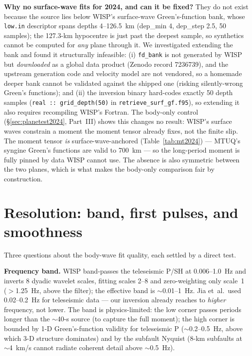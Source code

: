 \documentclass[11pt]{article}
\begin{document}
\textbf{Why no surface-wave fits for 2024, and can it be fixed?} They do not exist because the
source lies below WISP's surface-wave Green's-function bank, whose \texttt{low.in} descriptor
spans depths 4--126.5~km (dep\_min 4, dep\_step 2.5, 50 samples); the 127.3-km hypocentre is
just past the deepest sample, so synthetics cannot be computed for \emph{any} plane through it.
We investigated extending the bank and found it structurally infeasible: (i) \texttt{fd\_bank}
is not generated by WISP but \emph{downloaded} as a global data product (Zenodo record
7236739), and the upstream generation code and velocity model are not vendored, so a homemade
deeper bank cannot be validated against the shipped one (risking silently-wrong Green's
functions); and (ii) the inversion binary hard-codes exactly 50 depth samples
(\texttt{real :: grid\_depth(50)} in \texttt{retrieve\_surf\_gf.f95}), so extending it also
requires recompiling WISP's Fortran. The body-only control (\S\ref{sec:planetest2024},
Part~III) shows this changes no result: WISP's surface waves constrain a moment the moment
tensor already fixes, not the finite slip. The moment tensor \emph{is} surface-wave-anchored
(Table~\ref{tab:mt2024}) --- MTUQ's syngine Green's functions are valid to 700~km --- so the
long-period moment is fully pinned by data WISP cannot use. The absence is also symmetric
between the two planes, which is what makes the body-only comparison fair by construction.

\section{Resolution: band, first pulses, and smoothness}
\label{sec:resolution2024}
Three questions about the body-wave fit quality, each settled by a direct test.

\textbf{Frequency band.} WISP band-passes the teleseismic P/SH at 0.006--1.0~Hz and inverts
8 dyadic wavelet scales, fitting scales 2--8 and zero-weighting only scale~1 ($>$1.25~Hz,
above the filter); the effective band is $\sim$0.01--1~Hz. Jia et~al.\ used 0.02--0.2~Hz for
teleseismic data --- our inversion already reaches to \emph{higher} frequency, not lower. The
band is physics-limited: the low corner passes periods longer than the $\sim$40-s source (to
capture the full moment); the high corner is bounded by 1-D Green's-function validity for
teleseismic P ($\sim$0.2--0.5~Hz, above which 3-D structure dominates) and by the subfault
Nyquist (8-km subfaults at $\sim$4~km/s cannot radiate coherent detail above $\sim$0.5~Hz).
\end{document}
